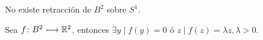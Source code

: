 \documentclass[GTSResumen.tex]{subfiles}
\begin{document}
\begin{teorema} No existe retracción de $B^2$ sobre $S^1$.
\end{teorema}

\begin{prop} Sea $f\colon{B^2}\longrightarrow{\mathbb{R}^2}$, entonces $\exists y\mid f(y)=0$ ó $z\mid f(z)=\lambda z, \lambda>0$.
\end{prop}

\vspace{0.2cm}
\end{document}
